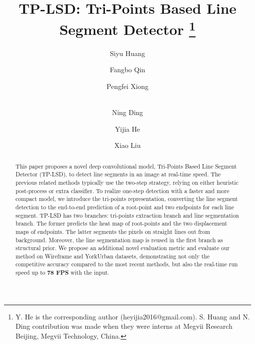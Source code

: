 \documentclass[runningheads]{llncs}
\begin{document}
\pagestyle{headings}
\mainmatter
\def\ECCVSubNumber{5931}  

\title{TP-LSD: Tri-Points Based Line Segment Detector \thanks{Y. He is the corresponding author (heyijia2016@gmail.com). S. Huang and N. Ding contribution was made when they were interns at Megvii Research Beijing, Megvii Technology, China.}}

\begin{comment}
\titlerunning{ECCV-20 submission ID \ECCVSubNumber}
\authorrunning{ECCV-20 submission ID \ECCVSubNumber}
\author{Anonymous ECCV submission}
\institute{Paper ID \ECCVSubNumber}
\end{comment}


\author{Siyu Huang \and
Fangbo Qin \and
Pengfei Xiong \and \\
Ning Ding \and
Yijia He \and 
Xiao Liu}


\maketitle

\begin{abstract}
This paper proposes a novel deep convolutional model, Tri-Points Based Line Segment Detector (TP-LSD), to detect line segments in an image at real-time speed. The previous related methods typically use the two-step strategy, relying on either heuristic post-process or extra classifier. To realize one-step detection with a faster and more compact model, we introduce the tri-points representation, converting the line segment detection to the end-to-end prediction of a root-point and two endpoints for each line segment. TP-LSD has two branches: tri-points extraction branch and line segmentation branch. The former predicts the heat map of root-points and the two displacement maps of endpoints. The latter segments the pixels on straight lines out from background. Moreover, the line segmentation map is reused in the first branch as structural prior. We propose an additional novel evaluation metric and evaluate our method on Wireframe and YorkUrban datasets, demonstrating not only the competitive accuracy compared to the most recent methods, but also the real-time run speed up to \textbf{78 FPS} with the  input.

\end{abstract}
\end{document}

